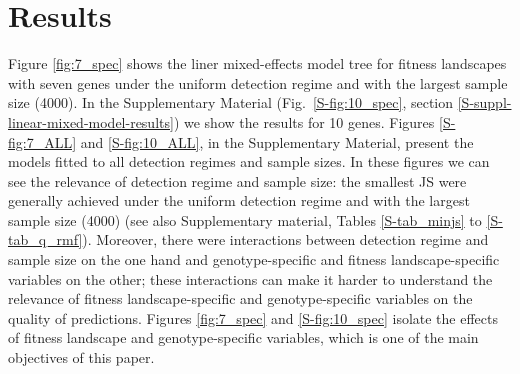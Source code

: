 \documentclass[a4paper,10pt]{article}
\newcommand{\idea}[1]{\textcolor{red}{#1}}
\begin{document}










\section{Results}\label{results}






Figure \ref{fig:7_spec} shows the liner mixed-effects model tree for
fitness landscapes with seven genes under the uniform detection regime and
with the largest sample size (4000). In the Supplementary Material
(Fig.~\ref{S-fig:10_spec}, section
\ref{S-suppl-linear-mixed-model-results}) we show the results for 10
genes. Figures \ref{S-fig:7_ALL} and \ref{S-fig:10_ALL}, in the
Supplementary Material, present the models fitted to all detection regimes
and sample sizes. In these figures we can see the relevance of detection
regime and sample size: the smallest JS were generally achieved under
the uniform detection regime and with the largest sample size (4000) (see
also Supplementary material, Tables \ref{S-tab_minjs} to
\ref{S-tab_q_rmf}).  
Moreover, there were
interactions between detection regime and sample size on the one hand and
genotype-specific and fitness landscape-specific variables on the other;
these interactions can make it harder to understand the relevance of
fitness landscape-specific and genotype-specific variables on the quality
of predictions. Figures \ref{fig:7_spec} and \ref{S-fig:10_spec} isolate
the effects of fitness landscape and genotype-specific variables, which is
one of the main objectives of this paper.
\end{document}
